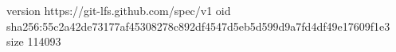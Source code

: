 version https://git-lfs.github.com/spec/v1
oid sha256:55c2a42de73177af45308278c892df4547d5eb5d599d9a7fd4df49e17609f1e3
size 114093
